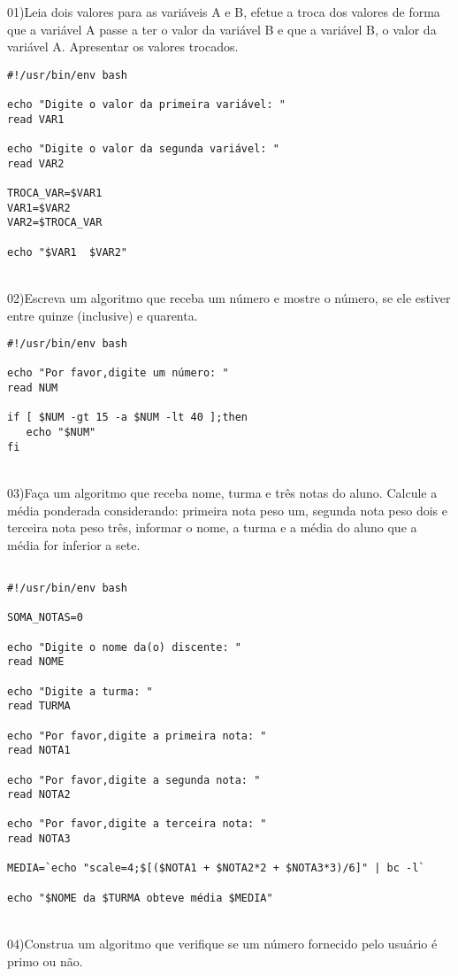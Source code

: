 \documentclass[a4paper,13pt]{article}
\begin{document}
01)Leia dois valores para as variáveis A e B, efetue a troca dos valores de forma que a variável A passe a ter o valor da variável B e que a variável B, o valor da variável A. Apresentar os valores trocados.
\\
\begin{verbatim}
#!/usr/bin/env bash

echo "Digite o valor da primeira variável: "
read VAR1

echo "Digite o valor da segunda variável: "
read VAR2

TROCA_VAR=$VAR1
VAR1=$VAR2
VAR2=$TROCA_VAR

echo "$VAR1  $VAR2"
\end{verbatim}
\\

02)Escreva um algoritmo que receba um número e mostre o número, se ele estiver entre quinze (inclusive) e quarenta.
\\
\begin{verbatim}
#!/usr/bin/env bash

echo "Por favor,digite um número: "
read NUM

if [ $NUM -gt 15 -a $NUM -lt 40 ];then
   echo "$NUM"
fi
\end{verbatim}
\\

03)Faça um algoritmo que receba nome, turma e três notas do aluno. Calcule a média ponderada considerando: primeira nota peso um, segunda nota peso dois e terceira nota peso três, informar o nome, a turma e a média do aluno que a média for inferior a sete.
\begin{verbatim}

#!/usr/bin/env bash

SOMA_NOTAS=0

echo "Digite o nome da(o) discente: "
read NOME

echo "Digite a turma: "
read TURMA

echo "Por favor,digite a primeira nota: "
read NOTA1

echo "Por favor,digite a segunda nota: "
read NOTA2

echo "Por favor,digite a terceira nota: "
read NOTA3

MEDIA=`echo "scale=4;$[($NOTA1 + $NOTA2*2 + $NOTA3*3)/6]" | bc -l`

echo "$NOME da $TURMA obteve média $MEDIA"
\end{verbatim}
\\

04)Construa um algoritmo que verifique se um número fornecido pelo usuário é primo ou não.
\end{document}

